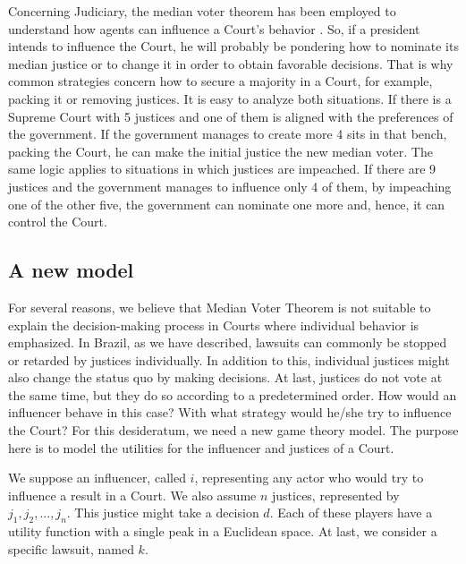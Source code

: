 \documentclass[12pt, a4paper]{article}
\begin{document}
Concerning Judiciary, the median voter theorem has been employed to understand how agents can influence a Court's behavior \citep{martin2004median}. So, if a president  intends to influence the Court, he will probably be pondering how to nominate its median justice or to change it in order to obtain favorable decisions. That is why common strategies concern how to secure a majority in a Court, for example, packing it or removing justices. It is easy to analyze both situations. If there is a Supreme Court with 5 justices and one of them is aligned with the preferences of the government. If the government manages to create more 4 sits in that bench, packing the Court, he can make the initial justice the new median voter. The same logic applies to situations in which justices are impeached. If there are 9 justices and the government manages to influence only 4 of them, by impeaching one of the other five, the government can nominate one more and, hence, it can control the Court.


\subsection{A new model}


For several reasons, we believe that Median Voter Theorem is not suitable to explain the decision-making process in Courts where individual behavior is emphasized. In Brazil, as we have described, lawsuits can commonly be stopped or retarded by justices individually. In addition to this, individual justices might also change the status quo by making decisions. At last, justices do not vote at the same time, but they do so according to a predetermined order. How would an influencer behave in this case? With what strategy would he/she try to influence the Court? For this desideratum, we need a new game theory model. The purpose here is to model the utilities for the influencer and justices of a Court.  

We suppose an influencer, called $i$, representing any actor who would try to influence a result in a Court. We also assume $n$ justices, represented by $j_1, j_2, ..., j_n$. This justice might take a decision $d$. Each of these players have a utility function with a single peak in a Euclidean space.  At last, we consider a specific lawsuit, named $k$.
\end{document}
